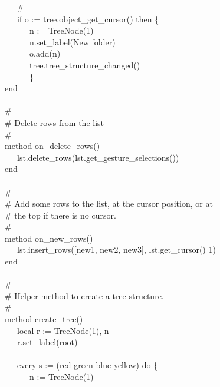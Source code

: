{\>   \ \ \ \# \\
\>   \ \ \ if o := tree.object\_get\_cursor() then \{ \\
\>   \ \ \ \ \ \ n := TreeNode(1) \\
\>   \ \ \ \ \ \ n.set\_label({\textquotedbl}New
folder{\textquotedbl}) \\
\>   \ \ \ \ \ \ o.add(n) \\
\>   \ \ \ \ \ \ tree.tree\_structure\_changed() \\
\>   \ \ \ \ \ \ \} \\
\>   end \\
\ \\
\>   \# \\
\>   \# Delete rows from the list \\
\>   \# \\
\>   method on\_delete\_rows() \\
\>   \ \ \ lst.delete\_rows(lst.get\_gesture\_selections()) \\
\>   end \\
\ \\
\>   \# \\
\>   \# Add some rows to the list, at the cursor position, or at \\
\>   \# the top if there is no cursor. \\
\>   \# \\
\>   method on\_new\_rows() \\
\>   \ \ \ lst.insert\_rows([{\textquotedbl}new1{\textquotedbl},
{\textquotedbl}new2{\textquotedbl},
{\textquotedbl}new3{\textquotedbl}], lst.get\_cursor() {\textbar} 1) \\
\>   end \\
\ \\
\>   \# \\
\>   \# Helper method to create a tree structure. \\
\>   \# \\
\>   method create\_tree() \\
\>   \ \ \ local r := TreeNode(1), n \\
\>   \ \ \ r.set\_label({\textquotedbl}root{\textquotedbl}) \\
\ \\
\>   \ \ \ every s := ({\textquotedbl}red{\textquotedbl} {\textbar}
{\textquotedbl}green{\textquotedbl} {\textbar}
{\textquotedbl}blue{\textquotedbl} {\textbar}
{\textquotedbl}yellow{\textquotedbl}) do \{ \\
\>   \ \ \ \ \ \ n := TreeNode(1) \\
}
